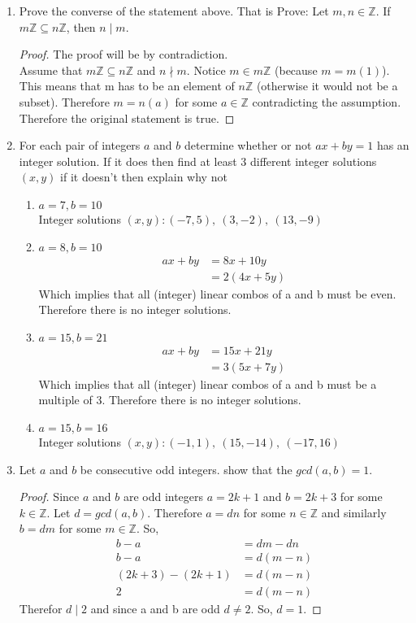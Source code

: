 \documentclass{article}
\newcommand{\Z}{\mathbb{Z}}
\newcommand{\divides}{\mid}
\newcommand{\notdivides}{\nmid}
\begin{document}
\begin{enumerate}
		\item Prove the converse of the statement above. That is Prove: 
		Let $m,n \in \Z$. If $m\Z \subseteq n\Z$, then $n \divides m$.    
		\begin{proof}
			The proof will be by contradiction.\\
			Assume that $m\Z \subseteq n\Z$ and $n \notdivides m$.
			Notice $m \in m\Z$ (because $m = m(1)$). This means that m has to be an element of $n\Z$ (otherwise it would not be a subset).
			Therefore $m = n(a)$ for some $a \in \Z$ contradicting the assumption. Therefore the original statement is true.
		\end{proof}
		\item For each pair of integers $a$ and $b$ determine whether or not $ax+by=1$ has an integer solution. If it does then find at least 3 different integer solutions $(x,y)$ if it doesn't then explain why not
		\begin{enumerate}
			\item $a=7, b= 10$\\
				Integer solutions $(x,y): (-7, 5 ),\ (3, -2 ),\ (13, -9)$

			\item $a=8, b= 10$\\
				\begin{align*}
					ax+by &= 8x+10y\\
						  &= 2(4x+5y) 
				\end{align*}
				Which implies that all (integer) linear combos of a and b must be even. Therefore there is no integer solutions. 
			\item $a=15, b= 21$ 
			\begin{align*}
				ax+by &= 15x + 21y\\
					  &= 3(5x+7y)
			\end{align*}
			Which implies that all (integer) linear combos of a and b must be a multiple of 3. Therefore there is no integer solutions.
			\item $a=15, b= 16$ \\
			Integer solutions $(x,y): (-1,1), \  (15, -14), \ (-17, 16)$
		\end{enumerate}
		\item Let $a$ and $b$ be consecutive odd integers. show that the $gcd(a,b)=1$.
		\begin{proof}
			Since $a$ and $b$ are odd integers $a = 2k +1$ and $b = 2k+3$ for some $k \in \Z$. Let $d = gcd(a,b)$. 
			Therefore $a = dn$ for some $n \in \Z$ and similarly $b = dm$ for some $m \in \Z$. So,
			\begin{align*}
					b - a &= dm-dn\\
					b - a &= d(m-n) \\
			(2k+3)-(2k+1) &= d(m-n)\\
			            2 &= d(m-n)
			\end{align*}
			Therefor $d \divides 2$ and since a and b are odd $d \not=2$. So, $d = 1$.
		\end{proof}
	\end{enumerate}
	
\end{document}
